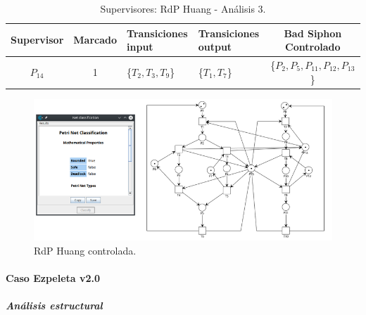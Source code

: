 \begin{table}[H]
    \small
    \centering
    \begin{tabular}{|c|c|P{2.2cm}|P{2.2cm}|c|}
    \hline
    \textbf{Supervisor} & \textbf{Marcado} & \textbf{Transiciones input} & \textbf{Transiciones output} & \textbf{Bad Siphon Controlado}  \\  \hline
    $P_{14}$ & 1 & \{$T_{2}, T_{3}, T_{9}$\} & \{$T_{1}, T_{7}$\} & \{$P_2, P_{5}, P_{11},P_{12}, P_{13}$\} \\ 
    \hline
    \end{tabular}
    \caption{Supervisores: RdP Huang - Análisis 3.}
    \label{tab:Huang3-v4}
\end{table}
\bigskip

\begin{figure}[H]
	\centering
	\includegraphics[width=\textwidth]{Figures/algoritmo4/huang_imag3.png}
	\caption{RdP Huang controlada.}
	\label{fig:Rdp-Huang-Contv4}
\end{figure}
\bigskip

\paragraph{Caso Ezpeleta v2.0}
\subparagraph{Análisis estructural}
\hfill

